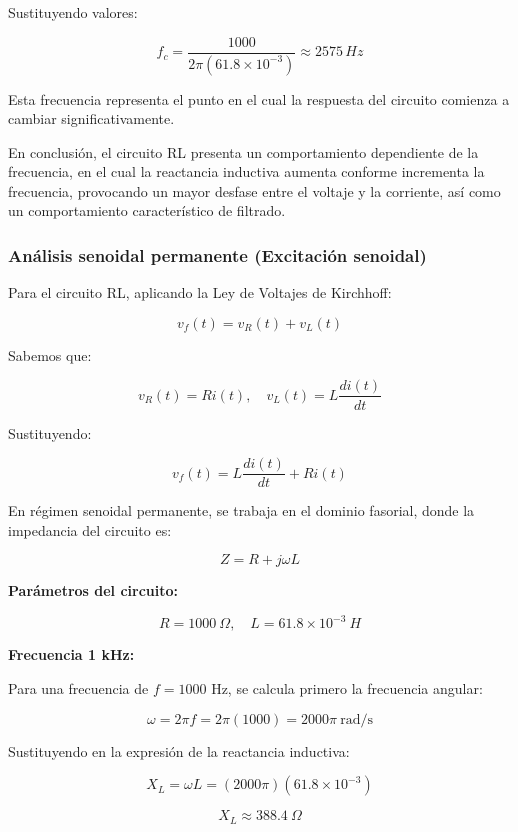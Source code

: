 \documentclass[letter,11pt]{article}
\begin{document}
			Sustituyendo valores:
			
			\[
			f_c = \frac{1000}{2\pi (61.8 \times 10^{-3})} \approx 2575\,Hz
			\]
			
			Esta frecuencia representa el punto en el cual la respuesta del circuito comienza a cambiar significativamente.
			
			\hspace{0.5cm}En conclusión, el circuito RL presenta un comportamiento dependiente de la frecuencia, en el cual la reactancia inductiva aumenta conforme incrementa la frecuencia, provocando un mayor desfase entre el voltaje y la corriente, así como un comportamiento característico de filtrado.
		
		\subsubsection{Análisis senoidal permanente (Excitación senoidal)}
		
			Para el circuito RL, aplicando la Ley de Voltajes de Kirchhoff:
			
			\[
			v_f(t) = v_R(t) + v_L(t)
			\]
			
			Sabemos que:
			
			\[
			v_R(t) = Ri(t), \quad v_L(t) = L \frac{di(t)}{dt}
			\]
			
			Sustituyendo:
			
			\[
			v_f(t) = L \frac{di(t)}{dt} + Ri(t)
			\]
			
			En régimen senoidal permanente, se trabaja en el dominio fasorial, donde la impedancia del circuito es:
			
			\[
			Z = R + j\omega L
			\]
			
			\textbf{Parámetros del circuito:}
			
			\[
			R = 1000 \ \Omega, \quad L = 61.8 \times 10^{-3} \ H
			\]
			
			\vspace{0.3cm}
			
			\textbf{Frecuencia 1 kHz:}
			
			Para una frecuencia de $f = 1000$ Hz, se calcula primero la frecuencia angular:
			
			\[
			\omega = 2\pi f = 2\pi(1000) = 2000\pi \ \text{rad/s}
			\]
			
			Sustituyendo en la expresión de la reactancia inductiva:
			
			\[
			X_L = \omega L = (2000\pi)(61.8 \times 10^{-3})
			\]
			
			\[
			X_L \approx 388.4 \ \Omega
			\]
			
\end{document}
